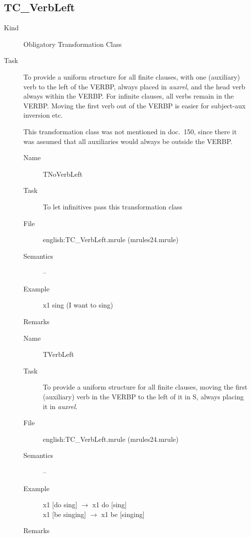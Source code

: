 \newpage
\subsection{TC\_VerbLeft}

\begin{description}
\item[Kind] Obligatory Transformation Class
\item[Task] To provide a uniform structure for all finite clauses, with one 
(auxiliary) verb to the left of the VERBP, always placed in {\em auxrel\/}, and 
the head verb always within the VERBP.
For infinite clauses, all verbs 
remain in the VERBP. Moving the first verb out of the VERBP is easier for 
subject-aux inversion etc.

This transformation class was not mentioned in doc.\ 150, since there it was 
assumed that all auxiliaries would always be outside the VERBP.


\vspace{1 cm}
\begin{description}
\item[Name] TNoVerbLeft
\item[Task] To let infinitives pass this transformation class
\item[File] english:TC\_VerbLeft.mrule (mrules24.mrule)
\item[Semantics] --
\item[Example] x1 sing (I want to sing)
\item[Remarks]
\end{description}

\vspace{1 cm}
\begin{description}
\item[Name] TVerbLeft
\item[Task] 
To provide a uniform structure for all finite clauses, moving the first
(auxiliary) verb in the VERBP to the left of it in S, always placing it in 
{\em auxrel\/}. 
\item[File] english:TC\_VerbLeft.mrule (mrules24.mrule)
\item[Semantics] --
\item[Example] x1 [do sing] $\rightarrow$ x1 do [sing] \\
x1 [be singing] $\rightarrow$ x1 be [singing]
\item[Remarks]
\end{description}

\end{description}

